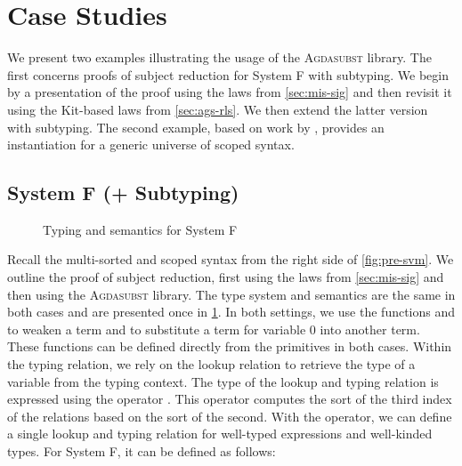 \documentclass[screen,nonacm]{acmart}
\begin{document}
\section{Case Studies}\label{sec:ext}
We present two examples illustrating the usage of the \textsc{Agdasubst}
library. The first concerns proofs of subject reduction for System F with
subtyping. We begin by a presentation of the proof using the laws from
\cref{sec:mis-sig} and then revisit it using the Kit-based laws from
\cref{sec:ags-rls}. We then extend the latter version with subtyping. The
second example, based on work by \citet{allais2021typescopesafeuniverse},
provides an instantiation for a generic universe of scoped syntax.
\subsection{System F (+ Subtyping)}\label{sec:ext-syf}

\begin{figure}[!t]
      \centering
      \begin{minipage}[t]{0.48\linewidth}
            \raggedright{}
            \ETyping{}
      \end{minipage}
      \hfill
      \begin{minipage}[t]{0.48\linewidth}
            \raggedright{}
            \ESemantics{}
      \end{minipage}
      \caption{Typing and semantics for System F}\label{fig:ext-tas}
\end{figure}

Recall the multi-sorted and scoped syntax from the right side of
\cref{fig:pre-svm}. We outline the proof of subject reduction, first using the
laws from \cref{sec:mis-sig} and then using the \textsc{Agdasubst} library. The
type system and semantics are the same in both cases and are presented once in
\cref{fig:ext-tas}. In both settings, we use the functions \EWk{} and \ESubst{}
to weaken a term and to substitute a term for variable 0 into another term.
These functions can be defined directly from the primitives in both cases.
Within the typing relation, we rely on the lookup relation \ELookup{} to
retrieve the type of a variable from the typing context. The type of the lookup
and typing relation is expressed using the operator . This
operator computes the sort of the third index of the relations based on the
sort of the second. With the  operator, we can define a
single lookup and typing relation for well-typed expressions and well-kinded
types. For System F, it can be defined as follows:
\end{document}
